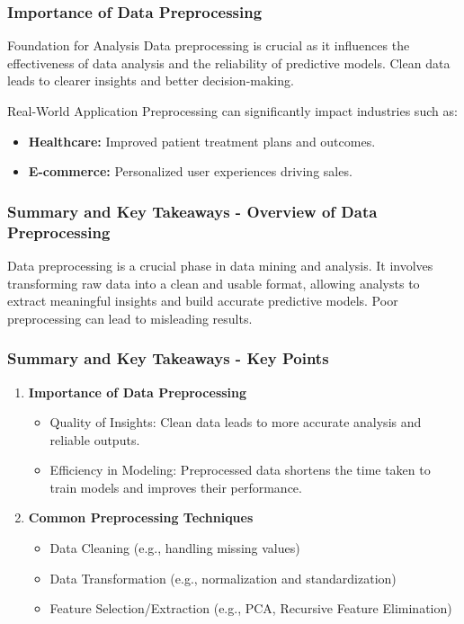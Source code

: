 \documentclass[aspectratio=169]{beamer}
\begin{document}
\begin{frame}[fragile]
    \frametitle{Importance of Data Preprocessing}
    \begin{block}{Foundation for Analysis}
        Data preprocessing is crucial as it influences the effectiveness of data analysis and the reliability of predictive models. Clean data leads to clearer insights and better decision-making.
    \end{block}
    
    \begin{block}{Real-World Application}
        Preprocessing can significantly impact industries such as:
        \begin{itemize}
            \item \textbf{Healthcare:} Improved patient treatment plans and outcomes.
            \item \textbf{E-commerce:} Personalized user experiences driving sales.
        \end{itemize}
    \end{block}
\end{frame}

\begin{frame}[fragile]
    \frametitle{Summary and Key Takeaways - Overview of Data Preprocessing}
    Data preprocessing is a crucial phase in data mining and analysis. It involves transforming raw data into a clean and usable format, allowing analysts to extract meaningful insights and build accurate predictive models. Poor preprocessing can lead to misleading results.
\end{frame}

\begin{frame}[fragile]
    \frametitle{Summary and Key Takeaways - Key Points}
    \begin{enumerate}
        \item \textbf{Importance of Data Preprocessing}
        \begin{itemize}
            \item Quality of Insights: Clean data leads to more accurate analysis and reliable outputs.
            \item Efficiency in Modeling: Preprocessed data shortens the time taken to train models and improves their performance.
        \end{itemize}
        
        \item \textbf{Common Preprocessing Techniques}
        \begin{itemize}
            \item Data Cleaning (e.g., handling missing values)
            \item Data Transformation (e.g., normalization and standardization)
            \item Feature Selection/Extraction (e.g., PCA, Recursive Feature Elimination)
        \end{itemize}
    \end{enumerate}
\end{frame}
\end{document}
